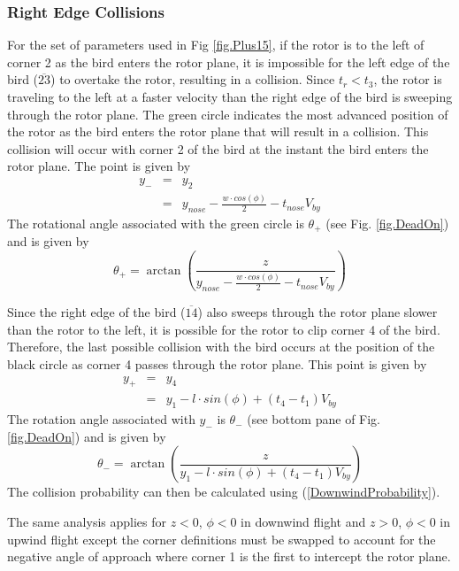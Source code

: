 \documentclass[10pt,conference]{IEEEtran}
\begin{document}
\subsubsection{Right Edge Collisions}
For the set of parameters used in Fig \ref{fig.Plus15}, if the rotor is to the left of corner 2 as the bird enters the
rotor plane, it is impossible for the left edge of the bird ($\overline{23}$) to overtake the rotor, resulting in a
collision. Since $t_r<t_3$, the rotor is traveling to the left at a faster velocity than the right edge of the bird is
sweeping through the rotor plane. The green circle indicates the most advanced position of the rotor as the bird enters
the rotor plane that will result in a collision. This collision will occur with corner 2 of the bird at the instant the
bird enters the rotor plane. The point is given by
\begin{eqnarray}
    \nonumber y_- &=& y_2\\
    &=& y_{nose}-\frac{w \cdot cos(\phi)}{2}-t_{nose}V_{by}
\end{eqnarray}
The rotational angle associated with the green circle is $\theta_+$ (see Fig. \ref{fig.DeadOn}) and is given by
\begin{equation}
    \theta_+ = \arctan\left(\frac{z}{y_{nose}-\frac{w \cdot cos(\phi)}{2}-t_{nose}V_{by}}\right)
\end{equation}

Since the right edge of the bird ($\overline{14}$) also sweeps through the rotor plane slower than the rotor to the
left, it is possible for the rotor to clip corner 4 of the bird. Therefore, the last possible collision with the bird
occurs at the position of the black circle as corner 4 passes through the rotor plane. This point is given by
\begin{eqnarray}
    \nonumber y_+ &=& y_4\\
    &=& y_1-l \cdot sin(\phi) + (t_4-t_1)V_{by}
\end{eqnarray}
The rotation angle associated with $y_-$ is $\theta_-$ (see bottom pane of Fig. \ref{fig.DeadOn}) and is given by
\begin{equation}
    \theta_- = \arctan\left(\frac{z}{y_1-l \cdot sin(\phi) + (t_4-t_1)V_{by}}\right)
\end{equation}
The collision probability can then be calculated using (\ref{DownwindProbability}).

The same analysis applies for $z<0$, $\phi<0$ in downwind flight and $z>0$, $\phi<0$ in upwind flight except the corner
definitions must be swapped to account for the negative angle of approach where corner 1 is the first to intercept the
rotor plane.
\end{document}
